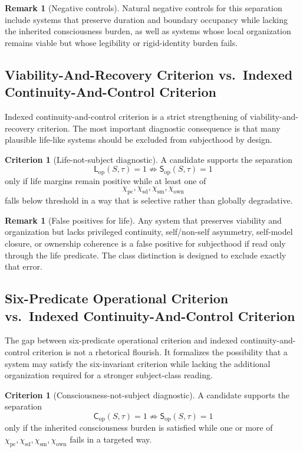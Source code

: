 \documentclass[11pt,a4paper]{article}
\theoremstyle{definition}
\newtheorem{remark}[proposition]{Remark}
\newtheorem{criterion}[proposition]{Criterion}
\newcommand{\Cop}{\mathsf{C}_{\mathrm{op}}}
\newcommand{\Lop}{\mathsf{L}_{\mathrm{op}}}
\newcommand{\Subop}{\mathsf{S}_{\mathrm{op}}}
\newcommand{\Priv}{\chi_{\mathrm{pc}}}
\newcommand{\SelfDisc}{\chi_{\mathrm{sd}}}
\newcommand{\SelfModel}{\chi_{\mathrm{sm}}}
\newcommand{\Own}{\chi_{\mathrm{own}}}
\begin{document}
\begin{remark}[Negative controls]
Natural negative controls for this separation include systems that preserve duration and boundary occupancy while lacking the inherited consciousness burden, as well as systems whose local organization remains viable but whose legibility or rigid-identity burden fails.
\end{remark}

\subsection{Viability-And-Recovery Criterion vs.\ Indexed Continuity-And-Control Criterion}
Indexed continuity-and-control criterion is a strict strengthening of viability-and-recovery criterion. The most important diagnostic consequence is that many plausible life-like systems should be excluded from subjecthood by design.

\begin{criterion}[Life-not-subject diagnostic]
A candidate supports the separation
\[
\Lop(S,\tau)=1 \not\Rightarrow \Subop(S,\tau)=1
\]
only if life margins remain positive while at least one of
\[
\Priv,\SelfDisc,\SelfModel,\Own
\]
falls below threshold in a way that is selective rather than globally degradative.
\end{criterion}

\begin{remark}[False positives for life]
Any system that preserves viability and organization but lacks privileged continuity, self/non-self asymmetry, self-model closure, or ownership coherence is a false positive for subjecthood if read only through the life predicate. The class distinction is designed to exclude exactly that error.
\end{remark}

\subsection{Six-Predicate Operational Criterion vs.\ Indexed Continuity-And-Control Criterion}
The gap between six-predicate operational criterion and indexed continuity-and-control criterion is not a rhetorical flourish. It formalizes the possibility that a system may satisfy the six-invariant criterion while lacking the additional organization required for a stronger subject-class reading.

\begin{criterion}[Consciousness-not-subject diagnostic]
A candidate supports the separation
\[
\Cop(S,\tau)=1 \not\Rightarrow \Subop(S,\tau)=1
\]
only if the inherited consciousness burden is satisfied while one or more of $\Priv,\SelfDisc,\SelfModel,\Own$ fails in a targeted way.
\end{criterion}
\end{document}
